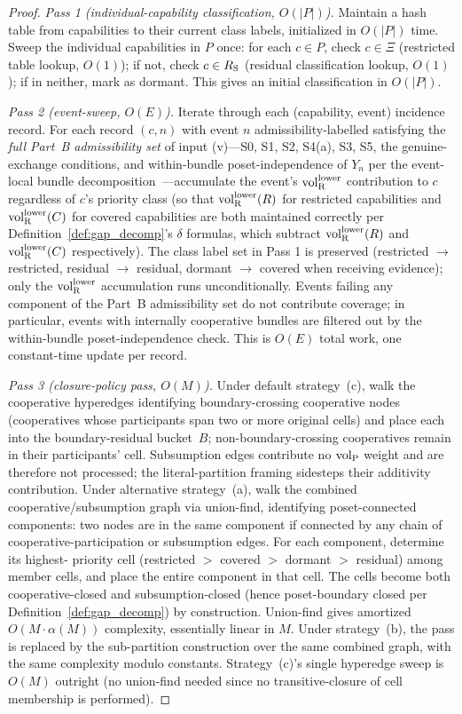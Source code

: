 \begin{proof}
\emph{Pass 1 (individual-capability classification,
$O(|P|)$).}
Maintain a hash table from capabilities to their current class
labels, initialized in $O(|P|)$ time.  Sweep the individual
capabilities in $P$ once: for each $c \in P$, check $c \in \Xi$
(restricted table lookup, $O(1)$); if not, check $c \in R_{\mathrm{S}}$
(residual classification lookup, $O(1)$); if in neither, mark as
dormant.  This gives an initial classification in $O(|P|)$.

\emph{Pass 2 (event-sweep, $O(E)$).}
Iterate through each (capability, event) incidence record.
For each record $(c, n)$ with event $n$ admissibility-labelled
satisfying the \emph{full Part~B admissibility set} of input
(v)---S0, S1, S2, S4(a), S3, S5, the genuine-exchange
conditions, and within-bundle poset-independence of $Y_n$ per
the event-local bundle decomposition~\citep[Revealed~Sacrifice]{lasser2026paper8a}---accumulate the
event's ${\operatorname{vol}_{\mathrm{R}}^{\mathrm{lower}}}$ contribution to $c$ regardless of $c$'s
priority class (so that ${\operatorname{vol}_{\mathrm{R}}^{\mathrm{lower}}}(R)$ for restricted
capabilities and ${\operatorname{vol}_{\mathrm{R}}^{\mathrm{lower}}}(C)$ for covered capabilities are
both maintained correctly per
Definition~\ref{def:gap_decomp}'s $\delta$ formulas, which
subtract ${\operatorname{vol}_{\mathrm{R}}^{\mathrm{lower}}}(R)$ and ${\operatorname{vol}_{\mathrm{R}}^{\mathrm{lower}}}(C)$ respectively).
The class label set in Pass 1 is preserved
(restricted $\to$ restricted, residual $\to$ residual, dormant
$\to$ covered when receiving evidence); only the
${\operatorname{vol}_{\mathrm{R}}^{\mathrm{lower}}}$ accumulation runs unconditionally.  Events failing
any component of the Part~B admissibility set do not contribute
coverage; in particular, events with internally cooperative
bundles are filtered out by the within-bundle
poset-independence check.  This is $O(E)$ total work, one
constant-time update per record.

\emph{Pass 3 (closure-policy pass, $O(M)$).}
Under default strategy~(c), walk the cooperative hyperedges
identifying boundary-crossing cooperative nodes (cooperatives
whose participants span two or more original cells) and place
each into the boundary-residual bucket~$B$; non-boundary-crossing
cooperatives remain in their participants' cell.  Subsumption
edges contribute no ${\operatorname{vol}_{\mathrm{P}}}$ weight and are therefore not
processed; the literal-partition framing sidesteps their
additivity contribution.  Under alternative strategy~(a), walk
the combined
cooperative/subsumption graph via union-find, identifying
poset-connected components: two nodes are in the same component
if connected by any chain of cooperative-participation or
subsumption edges.  For each component, determine its highest-
priority cell (restricted $>$ covered $>$ dormant $>$ residual)
among member cells, and place the entire component in that
cell.  The cells become both cooperative-closed and
subsumption-closed (hence poset-boundary closed per
Definition~\ref{def:gap_decomp}) by construction.  Union-find
gives amortized $O(M \cdot \alpha(M))$ complexity, essentially
linear in $M$.  Under strategy~(b), the pass is replaced
by the sub-partition construction over the same combined graph,
with the same complexity modulo constants.  Strategy~(c)'s
single hyperedge sweep is $O(M)$ outright (no union-find
needed since no transitive-closure of cell membership is
performed).


\end{proof}
